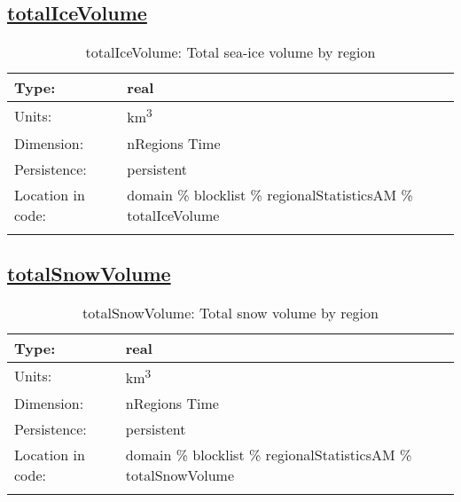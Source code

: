 \subsection[totalIceVolume]{\hyperref[sec:var_tab_regionalStatisticsAM]{totalIceVolume}}
\label{subsec:var_sec_regionalStatisticsAM_totalIceVolume}
\begin{center}
\begin{longtable}{| p{2.0in} | p{4.0in} |}
        \hline 
        Type: & real \\
        \hline 
        Units: & \si{km^3} \\
        \hline 
        Dimension: & nRegions Time \\
        \hline 
        Persistence: & persistent \\
        \hline 
         Location in code: & domain \% blocklist \% regionalStatisticsAM \% totalIceVolume \\
         \hline 
    \caption{totalIceVolume: Total sea-ice volume by region}
\end{longtable}
\end{center}
\subsection[totalSnowVolume]{\hyperref[sec:var_tab_regionalStatisticsAM]{totalSnowVolume}}
\label{subsec:var_sec_regionalStatisticsAM_totalSnowVolume}
\begin{center}
\begin{longtable}{| p{2.0in} | p{4.0in} |}
        \hline 
        Type: & real \\
        \hline 
        Units: & \si{km^3} \\
        \hline 
        Dimension: & nRegions Time \\
        \hline 
        Persistence: & persistent \\
        \hline 
         Location in code: & domain \% blocklist \% regionalStatisticsAM \% totalSnowVolume \\
         \hline 
    \caption{totalSnowVolume: Total snow volume by region}
\end{longtable}
\end{center}
